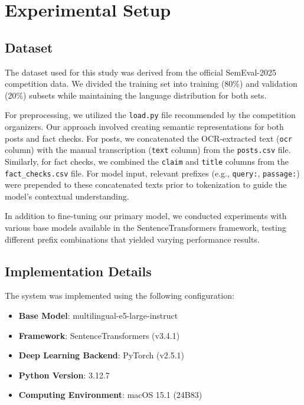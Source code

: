 \documentclass[11pt]{article}
\begin{document}
\section{Experimental Setup}

\subsection{Dataset}

The dataset used for this study was derived from the official SemEval-2025 competition data. We divided the training set into training (80\%) and validation (20\%) subsets while maintaining the language distribution for both sets.

For preprocessing, we utilized the \texttt{load.py} file recommended by the competition organizers. Our approach involved creating semantic representations for both posts and fact checks. For posts, we concatenated the OCR-extracted text (\texttt{ocr} column) with the manual transcription (\texttt{text} column) from the \texttt{posts.csv} file. Similarly, for fact checks, we combined the \texttt{claim} and \texttt{title} columns from the \texttt{fact\_checks.csv} file. For model input, relevant prefixes (e.g., \texttt{query:}, \texttt{passage:}) were prepended to these concatenated texts prior to tokenization to guide the model's contextual understanding.

In addition to fine-tuning our primary model, we conducted experiments with various base models available in the SentenceTransformers framework, testing different prefix combinations that yielded varying performance results.

\subsection{Implementation Details}

The system was implemented using the following configuration:

\begin{itemize}
    \item \textbf{Base Model}: multilingual-e5-large-instruct
    \item \textbf{Framework}: SentenceTransformers (v3.4.1)
    \item \textbf{Deep Learning Backend}: PyTorch (v2.5.1)
    \item \textbf{Python Version}: 3.12.7
    \item \textbf{Computing Environment}: macOS 15.1 (24B83)
\end{itemize}
\end{document}
